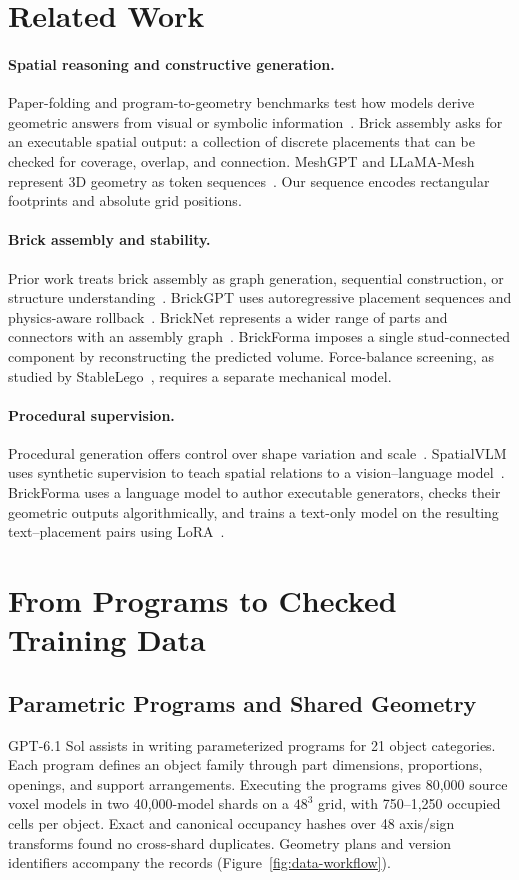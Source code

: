 \section{Related Work}
\paragraph{Spatial reasoning and constructive generation.}
Paper-folding and program-to-geometry benchmarks test how models derive geometric answers from visual or symbolic information~\cite{zhou2026paperfolding,luo2026geogrambench}. Brick assembly asks for an executable spatial output: a collection of discrete placements that can be checked for coverage, overlap, and connection. MeshGPT and LLaMA-Mesh represent 3D geometry as token sequences~\cite{meshgpt,llamamesh}. Our sequence encodes rectangular footprints and absolute grid positions.

\paragraph{Brick assembly and stability.}
Prior work treats brick assembly as graph generation, sequential construction, or structure understanding~\cite{thompson2020lego,brickbybrick,breakandmake}. BrickGPT uses autoregressive placement sequences and physics-aware rollback~\cite{brickgpt}. BrickNet represents a wider range of parts and connectors with an assembly graph~\cite{bricknet}. BrickForma imposes a single stud-connected component by reconstructing the predicted volume. Force-balance screening, as studied by StableLego~\cite{stablelego}, requires a separate mechanical model.

\paragraph{Procedural supervision.}
Procedural generation offers control over shape variation and scale~\cite{infinigen}. SpatialVLM uses synthetic supervision to teach spatial relations to a vision--language model~\cite{spatialvlm}. BrickForma uses a language model to author executable generators, checks their geometric outputs algorithmically, and trains a text-only model on the resulting text--placement pairs using LoRA~\cite{lora}.

\section{From Programs to Checked Training Data}
\label{sec:dataset}
\subsection{Parametric Programs and Shared Geometry}
GPT-6.1 Sol assists in writing parameterized programs for 21 object categories. Each program defines an object family through part dimensions, proportions, openings, and support arrangements. Executing the programs gives 80,000 source voxel models in two 40,000-model shards on a $48^3$ grid, with 750--1,250 occupied cells per object. Exact and canonical occupancy hashes over 48 axis/sign transforms found no cross-shard duplicates. Geometry plans and version identifiers accompany the records (Figure~\ref{fig:data-workflow}).

